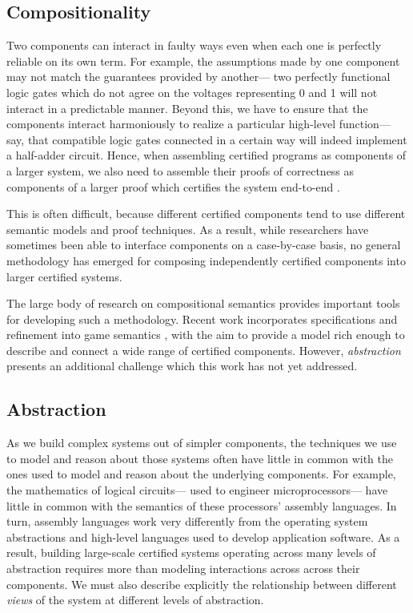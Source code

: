\documentclass[sigplan,10pt,review,anonymous]{acmart}
\begin{document}
\subsection{Compositionality}

Two components can interact in faulty ways
even when each one is perfectly reliable on its own term.
For example,
the assumptions made by one component
may not match the guarantees provided by another---%
two perfectly functional logic gates which do not agree
on the voltages representing 0 and 1
will not interact in a predictable manner.
Beyond this,
we have to ensure that the components
interact harmoniously
to realize a particular high-level function---%
say, that compatible logic gates
connected in a certain way will indeed
implement a half-adder circuit.
Hence, when assembling certified programs
as components of a larger system,
we also need to assemble their proofs of correctness
as components of a larger proof
which certifies the system end-to-end \cite{deepspec}.


This is often difficult,
because different certified components
tend to use different semantic models and proof techniques.
As a result,
while researchers have sometimes been able to interface
components on a case-by-case basis,
no general methodology has emerged
for composing independently certified components
into larger certified systems.

The large body of research on compositional semantics
provides important tools for developing such a methodology.
Recent work incorporates specifications and refinement
into game semantics \cite{rbgs-cal},
with the aim to provide a model rich enough
to describe and connect
a wide range of certified components.
However,
\emph{abstraction} presents an additional challenge
which this work has not yet addressed.

\subsection{Abstraction}

As we build complex systems out of simpler components,
the techniques we use to model and reason about those systems
often have little in common with
the ones used to model and reason about the underlying components.
For example,
the mathematics of logical circuits---%
used to engineer microprocessors---%
have little in common with
the semantics of these processors' assembly languages.
In turn, assembly languages work very differently from
the operating system abstractions and
high-level languages used to develop application software.
As a result,
building large-scale certified systems
operating across many levels of abstraction
requires more than
modeling interactions across across their components.
We must also describe explicitly
the relationship between
different \emph{views} of the system
at different levels of abstraction.
\end{document}
